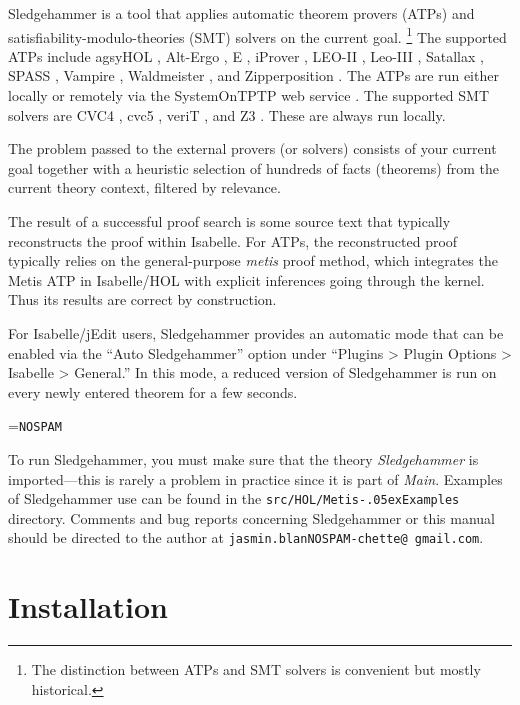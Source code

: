 \documentclass[a4paper,12pt]{article}
\renewcommand\_{\hbox{\textunderscore\kern-.05ex}}
\begin{document}
Sledgehammer is a tool that applies automatic theorem provers (ATPs)
and satisfiability-modulo-theories (SMT) solvers on the current goal.%
\footnote{The distinction between ATPs and SMT solvers is convenient but mostly
historical.}
%
The supported ATPs include agsyHOL \cite{agsyHOL}, Alt-Ergo \cite{alt-ergo}, E
\cite{schulz-2019}, iProver \cite{korovin-2009}, LEO-II \cite{leo2}, Leo-III
\cite{leo3}, Satallax \cite{satallax}, SPASS \cite{weidenbach-et-al-2009},
Vampire \cite{riazanov-voronkov-2002}, Waldmeister \cite{waldmeister}, and
Zipperposition \cite{cruanes-2014}. The ATPs are run either locally or remotely
via the System\-On\-TPTP web service \cite{sutcliffe-2000}. The supported SMT
solvers are CVC4 \cite{cvc4}, cvc5 \cite{barbosa-et-al-cvc5}, veriT
\cite{bouton-et-al-2009}, and Z3 \cite{de-moura-2008}. These are always run
locally.

The problem passed to the external provers (or solvers) consists of your current
goal together with a heuristic selection of hundreds of facts (theorems) from the
current theory context, filtered by relevance.

The result of a successful proof search is some source text that typically
reconstructs the proof within Isabelle. For ATPs, the reconstructed proof
typically relies on the general-purpose \textit{metis} proof method, which
integrates the Metis ATP in Isabelle/HOL with explicit inferences going through
the kernel. Thus its results are correct by construction.

For Isabelle/jEdit users, Sledgehammer provides an automatic mode that can be
enabled via the ``Auto Sledgehammer'' option under ``Plugins > Plugin Options >
Isabelle > General.'' In this mode, a reduced version of Sledgehammer is run on
every newly entered theorem for a few seconds.

\newbox\boxA
\setbox\boxA=\hbox{\texttt{NOSPAM}}

\newcommand\authoremail{\texttt{jasmin.blan{\color{white}NOSPAM}\kern-\wd\boxA{}chette@\allowbreak
gmail.\allowbreak com}}

To run Sledgehammer, you must make sure that the theory \textit{Sledgehammer} is
imported---this is rarely a problem in practice since it is part of
\textit{Main}. Examples of Sledgehammer use can be found in the
\texttt{src/HOL/Metis\_Examples} directory.  Comments and bug reports
concerning Sledgehammer or this manual should be directed to the author at
\authoremail.


\section{Installation}
\label{installation}
\end{document}

